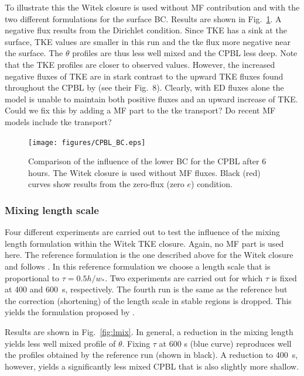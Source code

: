 \documentclass[dvipdfmx,a4paper,10pt]{article}
\begin{document}
To illustrate this the Witek closure is used without MF contribution and with the two different formulations for the surface BC. Results are shown in Fig.~\ref{fig:BC}.  A negative flux results from the Dirichlet condition. Since TKE has a sink at the surface, TKE values are smaller in this run and the tke flux more negative near the surface. The $\theta$ profiles are thus less well mixed and the CPBL less deep. Note that the TKE profiles are closer to observed values. However, the increased negative fluxes of TKE are in stark contrast to the upward TKE fluxes found throughout the CPBL by \cite{lenschow74} (see their Fig.~8). Clearly, with ED fluxes alone the model is unable to maintain both positive fluxes and an upward increase of TKE. {\color{blue} Could we fix this by adding a MF part to the tke transport? Do recent MF models include tke transport?}

\begin{figure}[bthp]
\centering
 \texttt{[image: figures/CPBL\_BC.eps]}
\caption{Comparison of the influence of the lower BC for the CPBL after 6 hours. The Witek closure is used without MF fluxes. Black (red) curves show results from the zero-flux (zero $e$) condition. } \label{fig:BC}
\end{figure}

\subsubsection{Mixing length scale}

Four different experiments are carried out to test the influence of the mixing length formulation within the Witek TKE closure. Again, no MF part is used here. The reference formulation is the one described above for the Witek closure and follows \cite{suselj13}. In this reference formulation we choose a length scale that is proportional to $\tau = 0.5 h/w_*$. Two experiments are carried out for which $\tau$ is fixed at 400 and 600~s, respectively. The fourth run is the same as the reference but the correction (shortening) of the length scale in stable regions is dropped. This yields the formulation proposed by \cite{teixeira04}. 

Results are shown in Fig.~\ref{fig:lmix}. In general, a reduction in the mixing length yields less well mixed profile of $\theta$. Fixing $\tau$ at 600 s (blue curve) reproduces well the profiles obtained by the reference run (shown in black). A reduction to 400~s, however, yields a significantly less mixed CPBL that is also slightly more shallow.  
\end{document}
